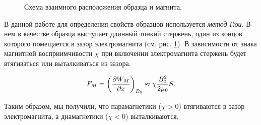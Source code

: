 \documentclass[12pt,a4paper]{article}
\newcommand{\figref}[1]{(см. рис. \ref{#1})}
\begin{document}
	\begin{figure}
		\vspace{-80pt}
		\caption{Схема взаимного расположения образца и магнита.}
		\label{img:rod}
	\end{figure}
	В данной работе для определения свойств образцов используется \textit{метод Гюи}. В нем в качестве образца выступает длинный тонкий стержень, один из концов которого помещается в зазор электромагнита \figref{img:rod}. 
	В зависимости от знака магнитной восприимчивости $\chi$ при включении электромагнита стержень будет втягиваться или выталкиваться из зазора.
	
	$$ F_M = \pdv{W_M}{x}_{B_0} \approx \chi \frac{B_0^2}{2 \mu_0} S. $$
	
	Таким образом, мы получили, что парамагнетики ($\chi > 0$) втягиваются в зазор электромагнита, а диамагнетики ($\chi < 0$) выталкиваются.
	
\end{document}
